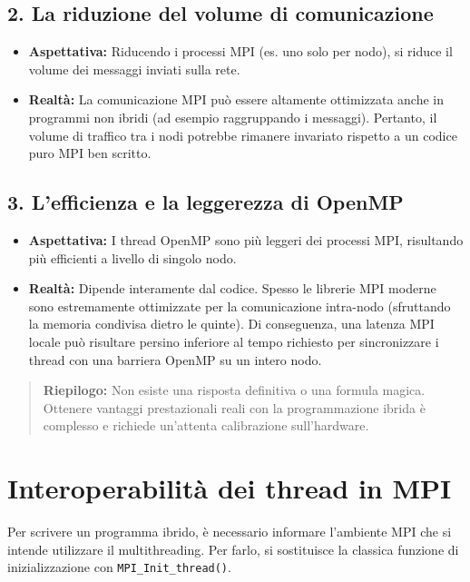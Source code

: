 \subsection*{2. La riduzione del volume di comunicazione}
\begin{itemize}
    \item \textbf{Aspettativa:} Riducendo i processi MPI (es. uno solo per nodo), si riduce il volume dei messaggi inviati sulla rete.
    \item \textbf{Realtà:} La comunicazione MPI può essere altamente ottimizzata anche in programmi non ibridi (ad esempio raggruppando i messaggi). Pertanto, il volume di traffico tra i nodi potrebbe rimanere invariato rispetto a un codice puro MPI ben scritto.
\end{itemize}

\subsection*{3. L'efficienza e la leggerezza di OpenMP}
\begin{itemize}
    \item \textbf{Aspettativa:} I thread OpenMP sono più leggeri dei processi MPI, risultando più efficienti a livello di singolo nodo.
    \item \textbf{Realtà:} Dipende interamente dal codice. Spesso le librerie MPI moderne sono estremamente ottimizzate per la comunicazione intra-nodo (sfruttando la memoria condivisa dietro le quinte). Di conseguenza, una latenza MPI locale può risultare persino inferiore al tempo richiesto per sincronizzare i thread con una barriera OpenMP su un intero nodo.
\end{itemize}


\vspace{0.5cm}
\noindent
\begin{quote}
    \textbf{Riepilogo:} Non esiste una risposta definitiva o una formula magica. Ottenere vantaggi prestazionali reali con la programmazione ibrida è complesso e richiede un'attenta calibrazione sull'hardware.
\end{quote}

\section{Interoperabilità dei thread in MPI}

Per scrivere un programma ibrido, è necessario informare l'ambiente MPI che si intende utilizzare il multithreading. Per farlo, si sostituisce la classica funzione di inizializzazione con \texttt{MPI\_Init\_thread()}.

